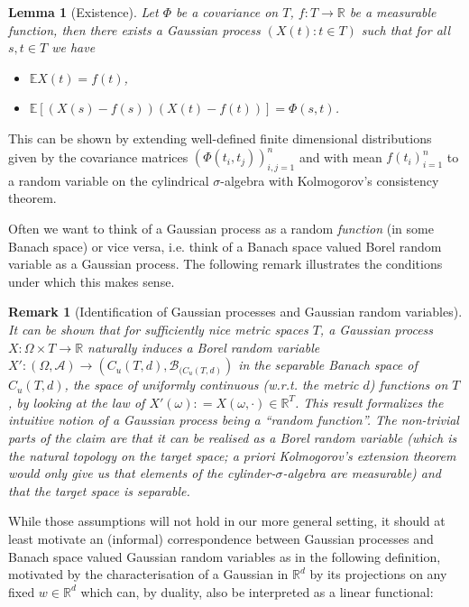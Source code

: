 \documentclass[11pt,reqno]{amsart}
\numberwithin{equation}{section}
\newtheorem{lem}[thm]{Lemma}
\newtheorem{rem}[thm]{Remark}
\newcommand{\deq}{\mathrel{\mathop:}=}
\begin{document}
\begin{lem}[Existence]\label{lem:existenceofGPgivenCov}
	Let $\Phi$ be a covariance on $T$, $f:T\rightarrow\mathbb R$ be a measurable function, then there exists a Gaussian process $(X(t):t\in T)$ such that for all $s,t\in T$ we have
	\begin{itemize}
		\item $\mathbb E X(t) = f(t)$,
		\item $\mathbb E[(X(s)-f(s))(X(t)-f(t))]=\Phi(s,t)$.
	\end{itemize}
\end{lem}

This can be shown by extending well-defined finite dimensional distributions given by the covariance matrices $(\Phi(t_i,t_j))_{i,j=1}^n$ and with mean $f(t_i)_{i=1}^n$ to a random variable on the cylindrical $\sigma$-algebra with Kolmogorov's consistency theorem.

Often we want to think of a Gaussian process as a random \emph{function} (in some Banach space) or vice versa, i.e. think of a Banach space valued Borel random variable as a Gaussian process. The following remark illustrates the conditions under which this makes sense.

\begin{rem}[Identification of Gaussian processes and Gaussian random variables]\label{rem:GPandGrvs}
	It can be shown that for sufficiently nice metric spaces $T$, a Gaussian process $X:\Omega\times T\rightarrow\mathbb R$ naturally induces a Borel random variable $X':(\Omega,\mathcal A)\rightarrow (C_u(T,d),\mathcal B_{(C_u(T,d)})$ in the separable Banach space of $C_u(T,d)$, the space of uniformly continuous (w.r.t. the metric $d$) functions on $T$, by looking at the law of $X'(\omega)\deq X(\omega,\cdot)\in\mathbb R^T$.
	This result formalizes the intuitive notion of a Gaussian process being a ``random function''. The non-trivial parts of the claim are that it can be realised as a \emph{Borel} random variable (which is the natural topology on the target space; a priori Kolmogorov's extension theorem would only give us that elements of the cylinder-$\sigma$-algebra are measurable) and that the target space is \emph{separable}.
\end{rem}

While those assumptions will not hold in our more general setting, it should at least motivate an (informal) correspondence between Gaussian processes and Banach space valued Gaussian random variables as in the following definition, motivated by the characterisation of a Gaussian in $\mathbb R^d$ by its projections on any fixed $w\in\mathbb R^d$ which can, by duality, also be interpreted as a linear functional:
\end{document}
